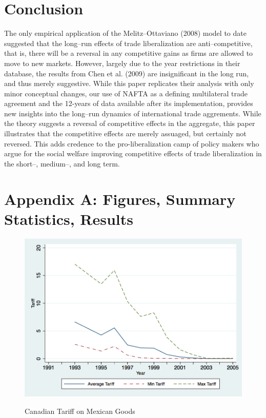 \documentclass[a4paper,12pt]{article}
\begin{document}
\section{Conclusion}\label{sec:conc}
The only empirical application of the Melitz--Ottaviano (2008) model to date suggested that the long--run effects of trade liberalization are anti--competitive, that is, there will be a reversal in any competitive gains as firms are allowed to move to new markets. However, largely due to the year restrictions in their database, the results from Chen et al. (2009) are insignificant in the long run, and thus merely suggestive. While this paper replicates their analysis with only minor conceptual changes, our use of NAFTA as a defining multilateral trade agreement and the 12-years of data available after its implementation, provides new insights into the long--run dynamics of international trade aggrements. While the theory suggests a reversal of competitive effects in the aggregate, this paper illustrates that the competitive effects are merely assuaged, but certainly not reversed. This adds credence to the pro-liberalization camp of policy makers who argue for the social welfare improving competitive effects of trade liberalization in the short--, medium--, and long term.
 
\newpage



\newpage

\section{Appendix A: Figures, Summary Statistics, Results}

\begin{figure}[htpb]\centering
\caption{Canadian Tariff on Mexican Goods}\vspace{0.2cm}
\includegraphics[scale=0.35]{can_mex_tariff}
\label{fig:can_mex}
\end{figure} 
\end{document}

